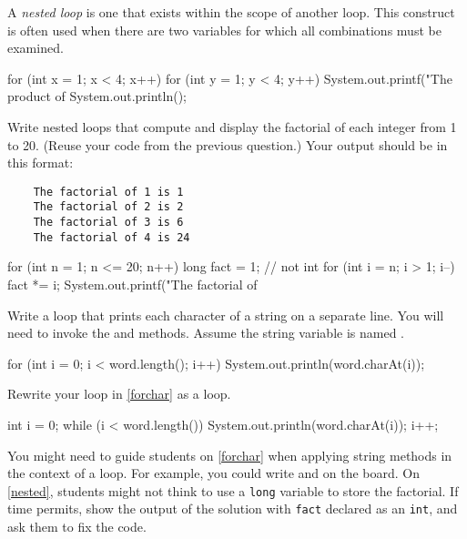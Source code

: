 
\Q \label{nested}
A \emph{nested loop} is one that exists within the scope of another loop.
This construct is often used when there are two variables for which all combinations must be examined.

\begin{javalst}
    for (int x = 1; x < 4; x++) {
        for (int y = 1; y < 4; y++) {
            System.out.printf("The product of %
        }
        System.out.println();
    }
\end{javalst}

Write nested loops that compute and display the factorial of each integer from 1 to 20.
(Reuse your code from the previous question.)
Your output should be in this format:

\vspace{-1ex}
\begin{verbatim}
    The factorial of 1 is 1
    The factorial of 2 is 2
    The factorial of 3 is 6
    The factorial of 4 is 24
\end{verbatim}
\vspace{-1ex}

\begin{answer}[9em]
\begin{javaans}
for (int n = 1; n <= 20; n++) {
    long fact = 1;  // not int
    for (int i = n; i > 1; i--) {
        fact *= i;
    }
    System.out.printf("The factorial of %
}
\end{javaans}
\end{answer}



\Q \label{forchar}
Write a  loop that prints each character of a string on a separate line.
You will need to invoke the  and  methods.
Assume the string variable is named .

\begin{answer}
\begin{javaans}
for (int i = 0; i < word.length(); i++) {
    System.out.println(word.charAt(i));
}
\end{javaans}
\end{answer}


\Q Rewrite your  loop in \ref{forchar} as a  loop.

\begin{answer}[6em]
\begin{javaans}
int i = 0;
while (i < word.length()) {
    System.out.println(word.charAt(i));
    i++;
}
\end{javaans}
\end{answer}



You might need to guide students on \ref{forchar} when applying string methods in the context of a loop.
For example, you could write  and  on the board.
On \ref{nested}, students might not think to use a {\tt long} variable to store the factorial.
If time permits, show the output of the solution with {\tt fact} declared as an {\tt int}, and ask them to fix the code.
